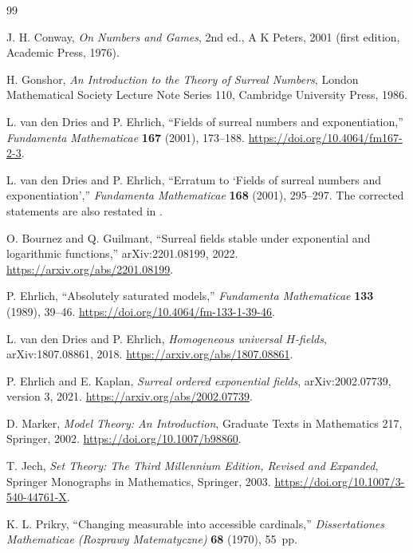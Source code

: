 \documentclass[11pt,letterpaper]{article}
\numberwithin{equation}{section}
\theoremstyle{definition}
\theoremstyle{remark}
\begin{document}
\clearpage
{}
{}
\begin{thebibliography}{99}

J. H. Conway, \emph{On Numbers and Games}, 2nd ed., A K Peters, 2001 (first
edition, Academic Press, 1976).

H. Gonshor, \emph{An Introduction to the Theory of Surreal Numbers}, London
Mathematical Society Lecture Note Series 110, Cambridge University Press, 1986.

L. van den Dries and P. Ehrlich, ``Fields of surreal numbers and
exponentiation,'' \emph{Fundamenta Mathematicae} \textbf{167} (2001), 173--188.
\url{https://doi.org/10.4064/fm167-2-3}.

L. van den Dries and P. Ehrlich, ``Erratum to `Fields of surreal numbers and
exponentiation','' \emph{Fundamenta Mathematicae} \textbf{168} (2001),
295--297. The corrected statements are also restated in
\cite[Theorems 1.1--1.2 and 3.3]{BournezGuilmant}.

O. Bournez and Q. Guilmant, ``Surreal fields stable under exponential and
logarithmic functions,'' arXiv:2201.08199, 2022.
\url{https://arxiv.org/abs/2201.08199}.

P. Ehrlich, ``Absolutely saturated models,'' \emph{Fundamenta Mathematicae}
\textbf{133} (1989), 39--46. \url{https://doi.org/10.4064/fm-133-1-39-46}.

L. van den Dries and P. Ehrlich, \emph{Homogeneous universal $H$-fields},
arXiv:1807.08861, 2018. \url{https://arxiv.org/abs/1807.08861}.

P. Ehrlich and E. Kaplan, \emph{Surreal ordered exponential fields},
arXiv:2002.07739, version 3, 2021. \url{https://arxiv.org/abs/2002.07739}.

D. Marker, \emph{Model Theory: An Introduction}, Graduate Texts in Mathematics
217, Springer, 2002. \url{https://doi.org/10.1007/b98860}.

T. Jech, \emph{Set Theory: The Third Millennium Edition, Revised and Expanded},
Springer Monographs in Mathematics, Springer, 2003.
\url{https://doi.org/10.1007/3-540-44761-X}.

K. L. Prikry, ``Changing measurable into accessible cardinals,''
\emph{Dissertationes Mathematicae (Rozprawy Matematyczne)} \textbf{68} (1970),
55~pp.


\end{thebibliography}
\end{document}
